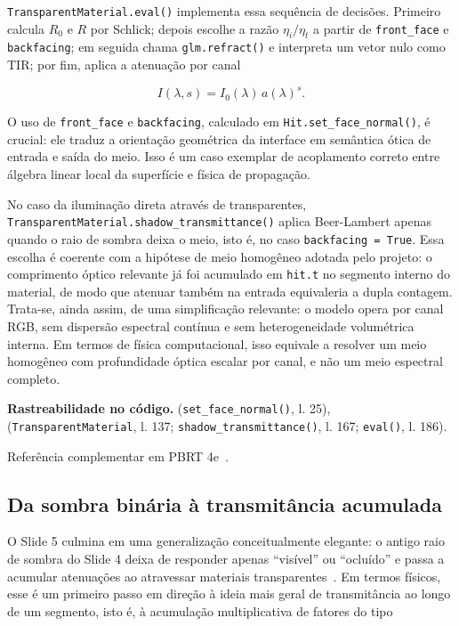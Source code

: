 \documentclass[portuguese]{sbcreviews-2025}%
\newcommand{\slidescite}[2]{\citep[pp.~#2]{#1}}
\newcommand{\pbrtsecs}[1]{PBRT 4e~\citep[Se\c{c}\~oes~#1]{pharr2023pbrt}}
\begin{document}
\texttt{TransparentMaterial.eval()} implementa essa sequência de decisões. Primeiro calcula $R_0$ e $R$ por Schlick; depois escolhe a razão $\eta_i/\eta_t$ a partir de \texttt{front\_face} e \texttt{backfacing}; em seguida chama \texttt{glm.refract()} e interpreta um vetor nulo como TIR; por fim, aplica a atenuação por canal

\[
I(\lambda,s)=I_0(\lambda)\,a(\lambda)^s.
\]

O uso de \texttt{front\_face} e \texttt{backfacing}, calculado em \texttt{Hit.set\_face\_normal()}, é crucial: ele traduz a orientação geométrica da interface em semântica ótica de entrada e saída do meio. Isso é um caso exemplar de acoplamento correto entre álgebra linear local da superfície e física de propagação.

No caso da iluminação direta através de transparentes, \texttt{TransparentMaterial.shadow\_transmittance()} aplica Beer-Lambert apenas quando o raio de sombra deixa o meio, isto é, no caso \texttt{backfacing = True}. Essa escolha é coerente com a hipótese de meio homogêneo adotada pelo projeto: o comprimento óptico relevante já foi acumulado em \texttt{hit.t} no segmento interno do material, de modo que atenuar também na entrada equivaleria a dupla contagem. Trata-se, ainda assim, de uma simplificação relevante: o modelo opera por canal RGB, sem dispersão espectral contínua e sem heterogeneidade volumétrica interna. Em termos de física computacional, isso equivale a resolver um meio homogêneo com profundidade óptica escalar por canal, e não um meio espectral completo.

\noindent\textbf{Rastreabilidade no código.}  (\texttt{set\_face\_normal()}, l. 25),  (\texttt{TransparentMaterial}, l. 137; \texttt{shadow\_transmittance()}, l. 167; \texttt{eval()}, l. 186).

Referência complementar em \pbrtsecs{9.3, 9.5 e 11.2}.

\subsection{Da sombra binária à transmitância acumulada}
\label{sec:slide5-transmitancia}

O Slide 5 culmina em uma generalização conceitualmente elegante: o antigo raio de sombra do Slide 4 deixa de responder apenas ``visível'' ou ``ocluído'' e passa a acumular atenuações ao atravessar materiais transparentes~\slidescite{inf2608slides05}{33--35}. Em termos físicos, esse é um primeiro passo em direção à ideia mais geral de transmitância ao longo de um segmento, isto é, à acumulação multiplicativa de fatores do tipo
\end{document}
